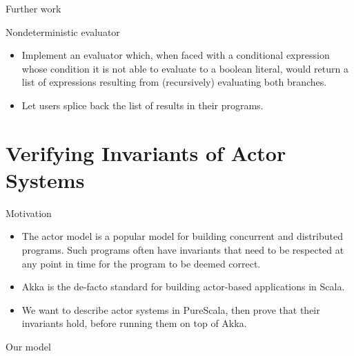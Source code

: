 \documentclass[ignorenonframetext,]{beamer}
\providecommand{\tightlist}{%
  \setlength{\itemsep}{0pt}\setlength{\parskip}{0pt}}
\begin{document}
\begin{frame}{%
\protect\hypertarget{further-work}{%
Further work}}

\begin{block}{Nondeterministic evaluator}

\begin{itemize}
\tightlist
\item
  Implement an evaluator which, when faced with a conditional expression
  whose condition it is not able to evaluate to a boolean literal, would
  return a list of expressions resulting from (recursively) evaluating
  both branches.
\item
  Let users splice back the list of results in their programs.
\end{itemize}

\end{block}

\end{frame}

\hypertarget{verifying-invariants-of-actor-systems}{%
\section{Verifying Invariants of Actor
Systems}\label{verifying-invariants-of-actor-systems}}

\begin{frame}{%
\protect\hypertarget{motivation-1}{%
Motivation}}

\begin{itemize}
\tightlist
\item
  The actor model is a popular model for building concurrent and
  distributed programs. Such programs often have invariants that need to
  be respected at any point in time for the program to be deemed
  correct.
\item
  Akka is the de-facto standard for building actor-based applications in
  Scala.
\item
  We want to describe actor systems in PureScala, then prove that their
  invariants hold, before running them on top of Akka.
\end{itemize}

\end{frame}

\begin{frame}{%
\protect\hypertarget{our-model}{%
Our model}}

\end{frame}
\end{document}
